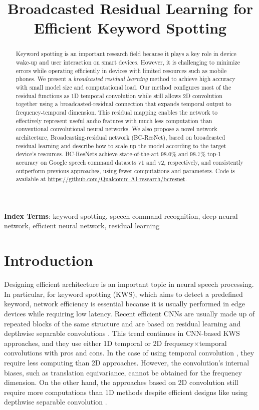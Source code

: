 \documentclass[a4paper]{article}
\title{Broadcasted Residual Learning for Efficient Keyword Spotting}
\begin{document}
\maketitle


\begin{abstract}
Keyword spotting is an important research field because it plays a key role in device wake-up and user interaction on smart devices. However, it is challenging to minimize errors while operating efficiently in devices with limited resources such as mobile phones. We present a \textit{broadcasted residual learning} method to achieve high accuracy with small model size and computational load. Our method configures most of the residual functions as 1D temporal convolution while still allows 2D convolution together using a broadcasted-residual connection that expands temporal output to frequency-temporal dimension. This residual mapping enables the network to effectively represent useful audio features with much less computation than conventional convolutional neural networks. We also propose a novel network architecture, Broadcasting-residual network (BC-ResNet), based on broadcasted residual learning and describe how to scale up the model according to the target device's resources. BC-ResNets achieve state-of-the-art $98.0 \%$ and  $98.7 \%$ top-1 accuracy on Google speech command datasets v1 and v2, respectively, and consistently outperform previous approaches, using fewer computations and parameters. Code is available at \href{https://github.com/Qualcomm-AI-research/bcresnet}{https://github.com/Qualcomm-AI-research/bcresnet}.
\end{abstract}
\noindent\textbf{Index Terms}: keyword spotting, speech command recognition, deep neural network, efficient neural network, residual learning

\section{Introduction}
Designing efficient architecture is an important topic in neural speech processing.
In particular, for keyword spotting (KWS), which aims to detect a predefined keyword, network efficiency is essential because it is usually performed in edge devices while requiring low latency. Recent efficient CNNs \cite{mobilenet1, mobilenet2, shufflenet, efficientnet} are usually made up of repeated blocks of the same structure and are based on residual learning \cite{residual} and depthwise separable convolutions \cite{depthwise_conv}. This trend continues in CNN-based KWS approaches, and they use either 1D temporal or 2D frequency$\times$temporal convolutions with pros and cons. In the case of using temporal convolution \cite{tcresnet, tenet, matchbox}, they require less computing than 2D approaches. However, the convolution's internal biases, such as translation equivariance, cannot be obtained for the frequency dimension. On the other hand, the approaches based on 2D convolution still require more computations than 1D methods despite efficient designs like using depthwise separable convolution \cite{res15, ds-resnet}.
\end{document}
